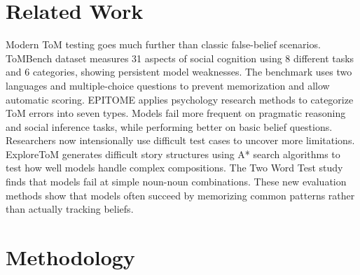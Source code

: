 \documentclass[11pt,a4paper]{article}
\begin{document}
\section{Related Work}
Modern ToM testing goes much further than classic false-belief scenarios. ToMBench dataset \cite{chen-etal-2024-tombench} measures 31 aspects of social cognition using 8 different tasks and 6 categories, showing persistent model weaknesses. The benchmark uses two languages and multiple-choice questions to prevent memorization and allow automatic scoring. EPITOME \cite{jones-etal-2024-comparing-humans} applies psychology research methods to categorize ToM errors into seven types. Models fail more frequent on pragmatic reasoning and social inference tasks, while performing better on basic belief questions. Researchers now intensionally use difficult test cases to uncover more limitations. ExploreToM generates difficult story structures using A* search algorithms to test how well models handle complex compositions. The Two Word Test study \cite{riccardi2023wordtestsemanticbenchmark} finds that models fail at simple noun-noun combinations. These new evaluation methods show that models often succeed by memorizing common patterns rather than actually tracking beliefs.


\section{Methodology}
\end{document}
